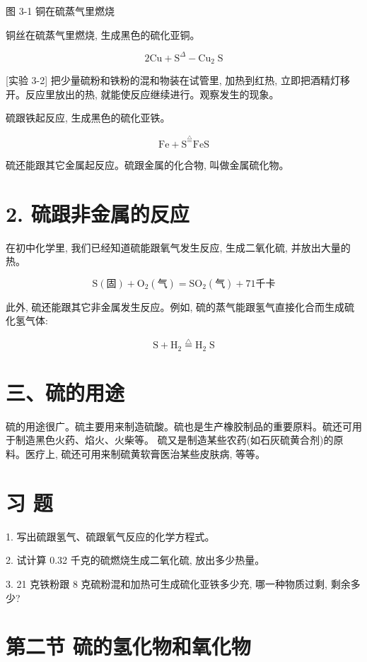 \documentclass[10pt]{article}
\begin{document}
图 3-1 铜在硫蒸气里燃烧

铜丝在硫蒸气里燃烧, 生成黑色的硫化亚铜。

\[
2\mathrm{{Cu}} + {\mathrm{S}}^{\Delta } - {\mathrm{{Cu}}}_{2}\mathrm{\;S}
\]

[实验 3-2] 把少量硫粉和铁粉的混和物装在试管里, 加热到红热, 立即把酒精灯移开。反应里放出的热, 就能使反应继续进行。观察发生的现象。

硫跟铁起反应, 生成黑色的硫化亚铁。

\[
\mathrm{{Fe}} + {\mathrm{S}}^{\overset{\bigtriangleup }{ = }}\mathrm{{FeS}}
\]

硫还能跟其它金属起反应。硫跟金属的化合物, 叫做金属硫化物。

\section*{2. 硫跟非金属的反应}

在初中化学里, 我们已经知道硫能跟氧气发生反应, 生成二氧化硫, 并放出大量的热。

\[
\mathrm{S}\left( \text{固}\right) + {\mathrm{O}}_{2}\left( \text{气}\right) = {\mathrm{{SO}}}_{2}\left( \text{气}\right) + {71}\text{千卡}
\]

此外, 硫还能跟其它非金属发生反应。例如, 硫的蒸气能跟氢气直接化合而生成硫化氢气体:

\[
\mathrm{S} + {\mathrm{H}}_{2}\overset{\bigtriangleup }{ = }{\mathrm{H}}_{2}\mathrm{\;S}
\]

\section*{三、硫的用途}

硫的用途很广。硫主要用来制造硫酸。硫也是生产橡胶制品的重要原料。硫还可用于制造黑色火药、焰火、火柴等。 硫又是制造某些农药(如石灰硫黄合剂)的原料。医疗上, 硫还可用来制硫黄软膏医治某些皮肤病, 等等。

\section*{习 题}

1. 写出硫跟氢气、硫跟氧气反应的化学方程式。

2. 试计算 0.32 千克的硫燃烧生成二氧化硫, 放出多少热量。

3. 21 克铁粉跟 8 克硫粉混和加热可生成硫化亚铁多少充, 哪一种物质过剩, 剩余多少?

\section*{第二节 硫的氢化物和氧化物}
\end{document}
